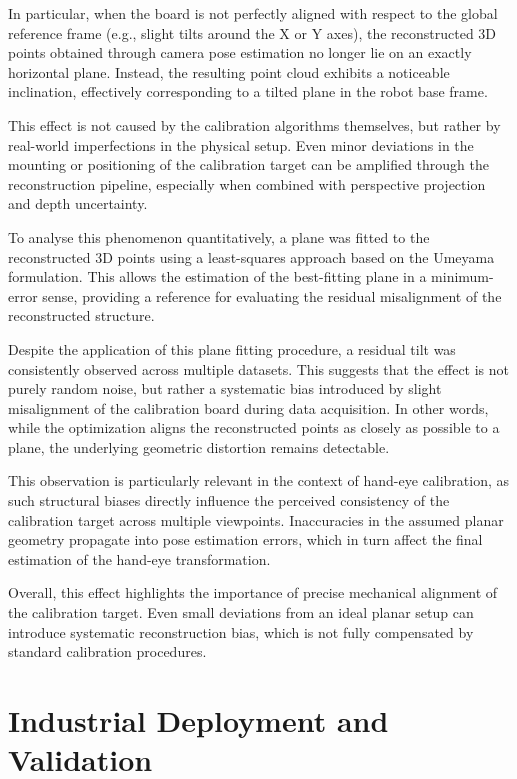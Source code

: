 In particular, when the board is not perfectly aligned with respect to the global reference frame (e.g., slight tilts around the X or Y axes), the reconstructed 3D points obtained through camera pose estimation no longer lie on an exactly horizontal plane. Instead, the resulting point cloud exhibits a noticeable inclination, effectively corresponding to a tilted plane in the robot base frame.

This effect is not caused by the calibration algorithms themselves, but rather by real-world imperfections in the physical setup. Even minor deviations in the mounting or positioning of the calibration target can be amplified through the reconstruction pipeline, especially when combined with perspective projection and depth uncertainty.

To analyse this phenomenon quantitatively, a plane was fitted to the reconstructed 3D points using a least-squares approach based on the Umeyama formulation. This allows the estimation of the best-fitting plane in a minimum-error sense, providing a reference for evaluating the residual misalignment of the reconstructed structure.

Despite the application of this plane fitting procedure, a residual tilt was consistently observed across multiple datasets. This suggests that the effect is not purely random noise, but rather a systematic bias introduced by slight misalignment of the calibration board during data acquisition. In other words, while the optimization aligns the reconstructed points as closely as possible to a plane, the underlying geometric distortion remains detectable.

This observation is particularly relevant in the context of hand-eye calibration, as such structural biases directly influence the perceived consistency of the calibration target across multiple viewpoints. Inaccuracies in the assumed planar geometry propagate into pose estimation errors, which in turn affect the final estimation of the hand-eye transformation.

Overall, this effect highlights the importance of precise mechanical alignment of the calibration target. Even small deviations from an ideal planar setup can introduce systematic reconstruction bias, which is not fully compensated by standard calibration procedures.









\section{Industrial Deployment and Validation}
\label{sec:industrial_validation}

